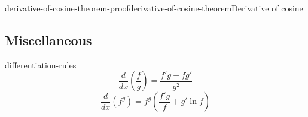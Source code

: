 \documentclass[preview]{standalone}
\begin{document}
\begin{snippetproof}{derivative-of-cosine-theorem-proof}{derivative-of-cosine-theorem}{Derivative of cosine}
    \todo %
\end{snippetproof}

\subsection{Miscellaneous}

\begin{snippet}{differentiation-rules}
    \[
        \frac{d}{dx}\left(\frac{f}{g}\right)=\frac{f'g-fg'}{g^2}
    \]
    \[
        \frac{d}{dx}(f^g)=f^g\left(\frac{f'g}{f}+g'\ln f\right)
    \]
\end{snippet}
\end{document}
